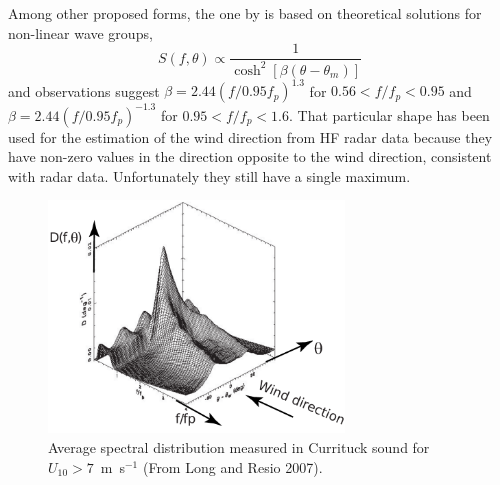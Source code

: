 Among other proposed forms, the one by \cite{Donelan&al.1985} is based on theoretical solutions for non-linear wave groups,
\begin{equation}
   S(f,\theta) \propto \frac{1}{\cosh^2\left[\beta \left(\theta-\theta_m\right)\right]}
\end{equation}
and observations suggest $\beta = 2.44 (f/0.95 f_p)^{1.3}$ for $0.56<f/f_p < 0.95$ and
$\beta = 2.44 (f/0.95 f_p)^{-1.3}$ for $0.95<f/f_p < 1.6$. 
That particular shape has been used for the estimation of the wind direction from HF radar data because they have non-zero values 
in the direction opposite to the wind direction, consistent with radar data. Unfortunately they still have a single maximum. 
\begin{figure}[htb]
\centerline{\includegraphics[width=0.7\textwidth]{FIGS_CH_FETCH/bimodal_en.pdf}}
  \caption{Average spectral distribution measured in Currituck sound for $U_{10} > 7$~m~s$^{-1}$ (From Long and Resio 2007).}
\label{bimodal}
\end{figure}

